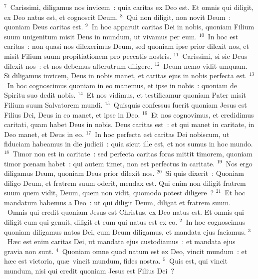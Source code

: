 ${}^{7}$~Carissimi, diligamus nos invicem~: quia caritas ex Deo est. Et omnis qui diligit, ex Deo natus est, et cognoscit Deum.
${}^{8}$~Qui non diligit, non novit Deum~: quoniam Deus caritas est.
${}^{9}$~In hoc apparuit caritas Dei in nobis, quoniam Filium suum unigenitum misit Deus in mundum, ut vivamus per eum.
${}^{10}$~In hoc est caritas~: non quasi nos dilexerimus Deum, sed quoniam ipse prior dilexit nos, et misit Filium suum propitiationem pro peccatis nostris.
${}^{11}$~Carissimi, si sic Deus dilexit nos~: et nos debemus alterutrum diligere.
${}^{12}$~Deum nemo vidit umquam. Si diligamus invicem, Deus in nobis manet, et caritas ejus in nobis perfecta est.
${}^{13}$~In hoc cognoscimus quoniam in eo manemus, et ipse in nobis~: quoniam de Spiritu suo dedit nobis.
${}^{14}$~Et nos vidimus, et testificamur quoniam Pater misit Filium suum Salvatorem mundi.
${}^{15}$~Quisquis confessus fuerit quoniam Jesus est Filius Dei, Deus in eo manet, et ipse in Deo.
${}^{16}$~Et nos cognovimus, et credidimus caritati, quam habet Deus in nobis. Deus caritas est~: et qui manet in caritate, in Deo manet, et Deus in eo.
${}^{17}$~In hoc perfecta est caritas Dei nobiscum, ut fiduciam habeamus in die judicii~: quia sicut ille est, et nos sumus in hoc mundo.
${}^{18}$~Timor non est in caritate~: sed perfecta caritas foras mittit timorem, quoniam timor pœnam habet~: qui autem timet, non est perfectus in caritate.
${}^{19}$~Nos ergo diligamus Deum, quoniam Deus prior dilexit nos.
${}^{20}$~Si quis dixerit~: Quoniam diligo Deum, et fratrem suum oderit, mendax est. Qui enim non diligit fratrem suum quem vidit, Deum, quem non vidit, quomodo potest diligere~?
${}^{21}$~Et hoc mandatum habemus a Deo~: ut qui diligit Deum, diligat et fratrem suum.
~\lettrine[lines=10,image=true,loversize=0.05,lraise=-0.03]{O}{}mnis qui credit quoniam Jesus est Christus, ex Deo natus est. Et omnis qui diligit eum qui genuit, diligit et eum qui natus est ex eo.
${}^{2}$~In hoc cognoscimus quoniam diligamus natos Dei, cum Deum diligamus, et mandata ejus faciamus.
${}^{3}$~H\ae c est enim caritas Dei, ut mandata ejus custodiamus~: et mandata ejus gravia non sunt.
${}^{4}$~Quoniam omne quod natum est ex Deo, vincit mundum~: et h\ae c est victoria, qu\ae\ vincit mundum, fides nostra.
${}^{5}$~Quis est, qui vincit mundum, nisi qui credit quoniam Jesus est Filius Dei~?


